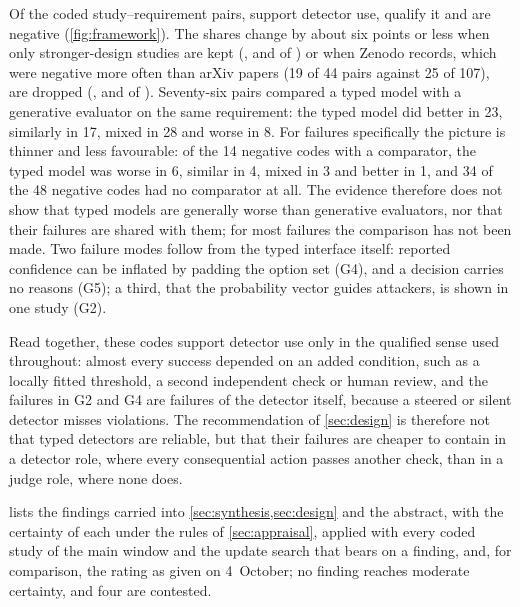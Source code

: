 Of the \nRows{} coded study--requirement pairs, \nS{} support detector use, \nQ{} qualify it and \nN{} are negative (\cref{fig:framework}).
The shares change by about six points or less when only stronger-design studies are kept (\nStrongS{}, \nStrongQ{} and \nStrongN{} of \nStrongRows{}) or when Zenodo records, which were negative more often than arXiv papers (19 of 44 pairs against 25 of 107), are dropped (\nNoZenS{}, \nNoZenQ{} and \nNoZenN{} of \nNoZenRows{}).
Seventy-six pairs compared a typed model with a generative evaluator on the same requirement: the typed model did better in 23, similarly in 17, mixed in 28 and worse in 8.
For failures specifically the picture is thinner and less favourable: of the 14 negative codes with a comparator, the typed model was worse in 6, similar in 4, mixed in 3 and better in 1, and 34 of the 48 negative codes had no comparator at all.
The evidence therefore does not show that typed models are generally worse than generative evaluators, nor that their failures are shared with them; for most failures the comparison has not been made.
Two failure modes follow from the typed interface itself: reported confidence can be inflated by padding the option set (G4), and a decision carries no reasons (G5); a third, that the probability vector guides attackers, is shown in one study (G2).

Read together, these codes support detector use only in the qualified sense used throughout: almost every success depended on an added condition, such as a locally fitted threshold, a second independent check or human review, and the failures in G2 and G4 are failures of the detector itself, because a steered or silent detector misses violations. The recommendation of \cref{sec:design} is therefore not that typed detectors are reliable, but that their failures are cheaper to contain in a detector role, where every consequential action passes another check, than in a judge role, where none does.

 lists the findings carried into \cref{sec:synthesis,sec:design} and the abstract, with the certainty of each under the rules of \cref{sec:appraisal}, applied with every coded study of the main window and the update search that bears on a finding, and, for comparison, the rating as given on 4~October; no finding reaches moderate certainty, and four are contested.

